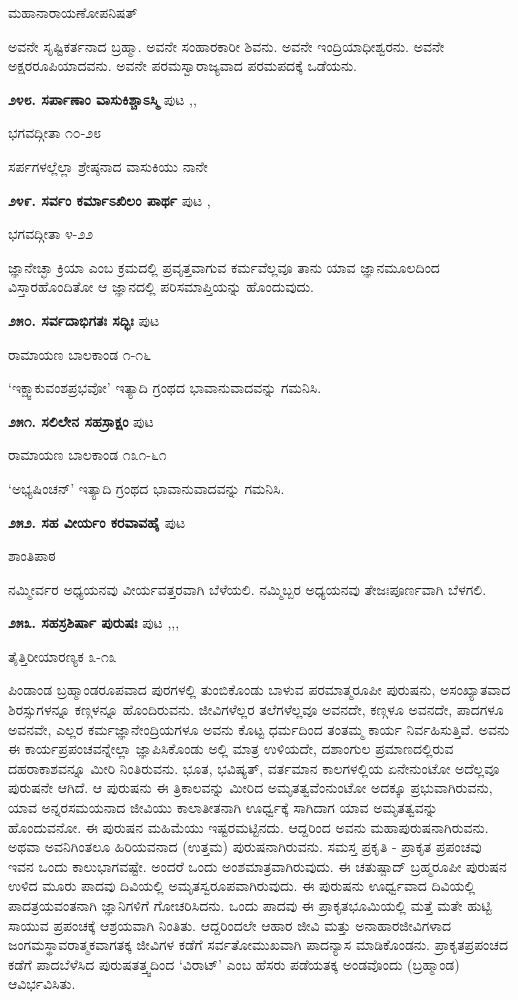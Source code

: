\hfill ಮಹಾನಾರಾಯಣೋಪನಿಷತ್

ಅವನೇ ಸೃಷ್ಟಿಕರ್ತನಾದ ಬ್ರಹ್ಮಾ. ಅವನೇ ಸಂಹಾರಕಾರೀ ಶಿವನು. ಅವನೇ ಇಂದ್ರಿಯಾಧೀಶ್ವರನು. ಅವನೇ ಅಕ್ಷರರೂಪಿಯಾದವನು. ಅವನೇ ಪರಮಸ್ವಾರಾಜ್ಯವಾದ ಪರಮಪದಕ್ಕೆ ಒಡೆಯನು. 

\medskip
\noindent\textbf{೨೪೮. ಸರ್ಪಾಣಾಂ ವಾಸುಕಿಶ್ಚಾಽಸ್ಮಿ} \hfill ಪುಟ \pageref{93},\pageref{95},\pageref{98}

\hfill ಭಗವದ್ಗೀತಾ ೧೦-೨೮

ಸರ್ಪಗಳಲ್ಲೆಲ್ಲಾ ಶ್ರೇಷ್ಠನಾದ ವಾಸುಕಿಯು ನಾನೇ

\medskip
\noindent\textbf{೨೪೯. ಸರ್ವಂ ಕರ್ಮಾಽಖಿಲಂ ಪಾರ್ಥ} \hfill ಪುಟ \pageref{98},\pageref{78}

\hfill ಭಗವದ್ಗೀತಾ ೪-೨೨

ಜ್ಞಾನೇಚ್ಛಾ ಕ್ರಿಯಾ ಎಂಬ ಕ್ರಮದಲ್ಲಿ ಪ್ರವೃತ್ತವಾಗುವ ಕರ್ಮವೆಲ್ಲವೂ ತಾನು ಯಾವ ಜ್ಞಾನಮೂಲದಿಂದ ವಿಸ್ತಾರಹೊಂದಿತೋ ಆ ಜ್ಞಾನದಲ್ಲಿ ಪರಿಸಮಾಪ್ತಿಯನ್ನು ಹೊಂದುವುದು.

\medskip
\noindent\textbf{೨೫೦. ಸರ್ವದಾಭಿಗತಃ ಸದ್ಭಿಃ} \hfill ಪುಟ \pageref{247}

\hfill ರಾಮಾಯಣ ಬಾಲಕಾಂಡ ೧-೧೬

`ಇಕ್ಷ್ವಾಕುವಂಶಪ್ರಭವೋ' ಇತ್ಯಾದಿ ಗ್ರಂಥದ ಭಾವಾನುವಾದವನ್ನು ಗಮನಿಸಿ.

\medskip
\noindent\textbf{೨೫೧. ಸಲಿಲೇನ ಸಹಸ್ರಾಕ್ಷಂ} \hfill ಪುಟ \pageref{248}

\hfill ರಾಮಾಯಣ ಬಾಲಕಾಂಡ ೧೩೧-೬೧

`ಅಭ್ಯಷಿಂಚನ್' ಇತ್ಯಾದಿ ಗ್ರಂಥದ ಭಾವಾನುವಾದವನ್ನು ಗಮನಿಸಿ.

\medskip
\noindent\textbf{೨೫೨. ಸಹ ವೀರ್ಯಂ ಕರವಾವಹೈ} \hfill ಪುಟ \pageref{130}

\hfill ಶಾಂತಿಪಾಠ

ನಮ್ಮೀರ್ವರ ಅಧ್ಯಯನವು ವೀರ್ಯವತ್ತರವಾಗಿ ಬೆಳೆಯಲಿ. ನಮ್ಮಿಬ್ಬರ ಅಧ್ಯಯನವು ತೇಜಃಪೂರ್ಣವಾಗಿ ಬೆಳಗಲಿ.

\medskip
\noindent\textbf{೨೫೩. ಸಹಸ್ರಶಿರ್ಷಾ ಪುರುಷಃ} \hfill ಪುಟ \pageref{108},\pageref{150},\pageref{218},\pageref{249}

\hfill ತೈತ್ತಿರೀಯಾರಣ್ಯಕ ೩-೧೩

ಪಿಂಡಾಂಡ ಬ್ರಹ್ಮಾಂಡರೂಪವಾದ ಪುರಗಳಲ್ಲಿ ತುಂಬಿಕೊಂಡು ಬಾಳುವ ಪರಮಾತ್ಮರೂಪೀ ಪುರುಷನು, ಅಸಂಖ್ಯಾತವಾದ ಶಿರಸ್ಸುಗಳನ್ನೂ ಕಣ್ಗಳನ್ನೂ ಹೊಂದಿರುವನು. ಜೀವಿಗಳೆಲ್ಲರ ತಲೆಗಳೆಲ್ಲವೂ ಅವನದೇ, ಕಣ್ಗಳೂ ಅವನದೇ, ಪಾದಗಳೂ ಅವನವೇ, ಎಲ್ಲರ ಕರ್ಮಜ್ಞಾನೇಂದ್ರಿಯಗಳೂ ಅವನು ಕೊಟ್ಟ ಧರ್ಮದಿಂದ ತಂತಮ್ಮ ಕಾರ್ಯ ನಿರ್ವಹಿಸುತ್ತಿವೆ. ಅವನು ಈ ಕಾರ್ಯಪ್ರಪಂಚವನ್ನೇಲ್ಲಾ ಜ್ಞಾಪಿಸಿಕೊಂಡು ಅಲ್ಲಿ ಮಾತ್ರ ಉಳಿಯದೇ, ದಶಾಂಗುಲ ಪ್ರಮಾಣದಲ್ಲಿರುವ ದಹರಾಕಾಶವನ್ನೂ ಮೀರಿ ನಿಂತಿರುವನು. ಭೂತ, ಭವಿಷ್ಯತ್, ವರ್ತಮಾನ ಕಾಲಗಳಲ್ಲಿಯ ಏನೇನುಂಟೋ ಅದೆಲ್ಲವೂ ಪುರುಷನೇ ಆಗಿದೆ. ಆ ಪುರುಷನು ಈ ತ್ರಿಕಾಲವನ್ನು ಮೀರಿದ ಅಮೃತತ್ವವೆಂನುಂಟೋ ಅದಕ್ಕೂ ಪ್ರಭುವಾಗಿರುವನು, ಯಾವ ಅನ್ನರಸಮಯನಾದ ಜೀವಿಯು ಕಾಲಾತೀತನಾಗಿ ಊರ್ಧ್ವಕ್ಕೆ ಸಾಗಿದಾಗ ಯಾವ ಅಮೃತತ್ವವನ್ನು ಹೊಂದುವನೋ. ಈ ಪುರುಷನ ಮಹಿಮೆಯು ಇಷ್ಟರಮಟ್ಟಿನದು. ಆದ್ದರಿಂದ ಅವನು ಮಹಾಪುರುಷನಾಗಿರುವನು. ಅಥವಾ ಅವನಿಗಿಂತಲೂ ಹಿರಿಯವನಾದ (ಉತ್ತಮ) ಪುರುಷನಾಗಿರುವನು. ಸಮಸ್ತ ಪ್ರಕೃತಿ - ಪ್ರಾಕೃತ ಪ್ರಪಂಚವು ಇವನ ಒಂದು ಕಾಲುಭಾಗವಷ್ಟೇ. ಅಂದರೆ ಒಂದು ಅಂಶಮಾತ್ರವಾಗಿರುವುದು. ಈ ಚತುಷ್ಪಾದ್ ಬ್ರಹ್ಮರೂಪೀ ಪುರುಷನ ಉಳಿದ ಮೂರು ಪಾದವು ದಿವಿಯಲ್ಲಿ ಅಮೃತಸ್ವರೂಪವಾಗಿರುವುದು. ಈ ಪುರುಷನು ಊರ್ಧ್ವವಾದ ದಿವಿಯಲ್ಲಿ ಪಾದತ್ರಯವಂತನಾಗಿ ಜ್ಞಾನಿಗಳಿಗೆ ಗೋಚರಿಸಿದನು. ಒಂದು ಪಾದವು ಈ ಪ್ರಾಕೃತಭೂಮಿಯಲ್ಲಿ ಮತ್ತೆ ಮತೇ ಹುಟ್ಟಿ ಸಾಯುವ ಪ್ರಪಂಚಕ್ಕೆ ಆಶ್ರಯವಾಗಿ ನಿಂತಿತು. ಆದ್ದರಿಂದಲೇ ಆಹಾರ ಜೀವಿ ಮತ್ತು ಅನಾಹಾರಜೀವಿಗಳಾದ ಜಂಗಮಸ್ಥಾವರಾತ್ಮಕವಾಗತಕ್ಕ ಜೀವಿಗಳ ಕಡೆಗೆ ಸರ್ವತೋಮುಖವಾಗಿ ಪಾದನ್ಯಾಸ ಮಾಡಿಕೊಂಡನು. ಪ್ರಾಕೃತಪ್ರಪಂಚದ ಕಡೆಗೆ ಪಾದಬೆಳೆಸಿದ ಪುರುಷತತ್ತ್ವದಿಂದ `ವಿರಾಟ್' ಎಂಬ ಹೆಸರು ಪಡೆಯತಕ್ಕ ಅಂಡವೊಂದು (ಬ್ರಹ್ಮಾಂಡ) ಆವಿರ್ಭವಿಸಿತು.

